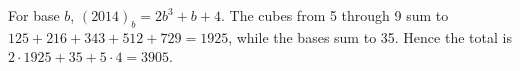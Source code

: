 For base $ b $, $(2014)_b=2b^3+b+4 $. The cubes from 5 through 9 sum to $ 125+216+343+512+729=1925 $, while the bases sum to 35. Hence the total is $ 2\cdot1925+35+5\cdot4=\boxed{3905}$.
